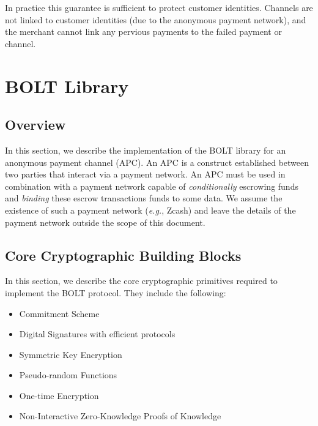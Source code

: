 \documentclass[11pt]{report}
\begin{document}
In practice this guarantee is sufficient to protect customer identities. Channels are not linked to customer identities (due to the anonymous payment network), and the merchant cannot link any pervious payments to the failed payment or channel.


\chapter{BOLT Library}
\label{ch:bolt}
\thispagestyle{myfancypage}

\section{Overview}

In this section, we describe the implementation of the BOLT library for an anonymous payment channel (APC). An APC is a construct established between two parties that interact via a payment network. An APC must be used in combination with a payment network capable of {\em conditionally} escrowing funds and {\em binding} these escrow transactions funds to some data. We assume the existence of such a payment network ({\em e.g.}, Zcash) and leave the details of the payment network outside the scope of this document.

\section{Core Cryptographic Building Blocks}
\label{sec:core}

In this section, we describe the core cryptographic primitives required to implement the BOLT protocol. They include the following:

\begin{itemize}
\item Commitment Scheme
\item Digital Signatures with efficient protocols
\item Symmetric Key Encryption
\item Pseudo-random Functions
\item One-time Encryption
\item Non-Interactive Zero-Knowledge Proofs of Knowledge
\end{itemize}
\end{document}
